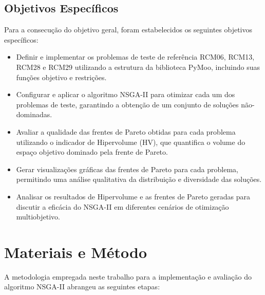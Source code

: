 \documentclass[12pt,openright,oneside,a4paper,english,brazil]{abntex2}
\begin{document}
\section{Objetivos Específicos}
Para a consecução do objetivo geral, foram estabelecidos os seguintes objetivos específicos:\begin{itemize}
    \item Definir e implementar os problemas de teste de referência RCM06, RCM13, RCM28 e RCM29 utilizando a estrutura da biblioteca PyMoo, incluindo suas funções objetivo e restrições.
    \item Configurar e aplicar o algoritmo NSGA-II para otimizar cada um dos problemas de teste, garantindo a obtenção de um conjunto de soluções não-dominadas.
    \item Avaliar a qualidade das frentes de Pareto obtidas para cada problema utilizando o indicador de Hipervolume (HV), que quantifica o volume do espaço objetivo dominado pela frente de Pareto.
    \item Gerar visualizações gráficas das frentes de Pareto para cada problema, permitindo uma análise qualitativa da distribuição e diversidade das soluções.
    \item Analisar os resultados de Hipervolume e as frentes de Pareto geradas para discutir a eficácia do NSGA-II em diferentes cenários de otimização multiobjetivo.
\end{itemize}


\chapter{Materiais e Método}
A metodologia empregada neste trabalho para a implementação e avaliação do algoritmo NSGA-II abrangeu as seguintes etapas:
\end{document}
